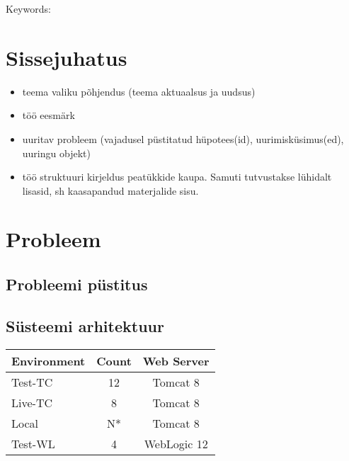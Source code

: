 \documentclass[12pt]{report}
\renewcommand{\headrulewidth}{0pt}
\begin{document}
  Keywords:
  
  \newpage
 
  \tableofcontents
  \fancypagestyle{plain}{%
    \renewcommand{\headrulewidth}{0pt}%
    \fancyhf{}%
    \fancyfoot[R]{\thepage}%
}
 
  \newpage
  
  \section*{Sissejuhatus}
  \label{sissejuhatus}
  
  \begin{itemize}
    \item teema valiku põhjendus (teema aktuaalsus ja uudsus)
    \item töö eesmärk
    \item  uuritav probleem (vajadusel püstitatud hüpotees(id), uurimisküsimus(ed), uuringu objekt)
    \item töö struktuuri kirjeldus peatükkide kaupa. Samuti tutvustakse lühidalt lisasid, sh kaasapandud
materjalide sisu.
  \end{itemize}
  
  \newpage
  
  \section{Probleem}
  
  \subsection{Probleemi püstitus}
  
  \subsection{Süsteemi arhitektuur}
  
  \begin{tabular}{|l|c|c|}
    \hline
    Environment & Count & Web Server\\
    \hline
    Test-TC & 12 & Tomcat 8\\
    Live-TC & 8 & Tomcat 8\\
    Local & N* & Tomcat 8\\
    Test-WL & 4 & WebLogic 12\\
    \hline
  \end{tabular}
\end{document}
